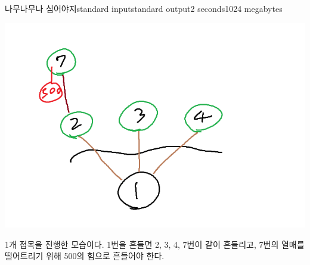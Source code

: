 \begin{problem}{나무나무나 심어야지}{standard input}{standard output}{2 seconds}{1024 megabytes}
\begin{center}
\includegraphics[scale=0.5]{4img.png}

\end{center} 
1개 접목을 진행한 모습이다. 1번을 흔들면 2, 3, 4, 7번이 같이 흔들리고, 7번의 열매를 떨어트리기 위해 500의 힘으로 흔들어야 한다.

\end{problem}

